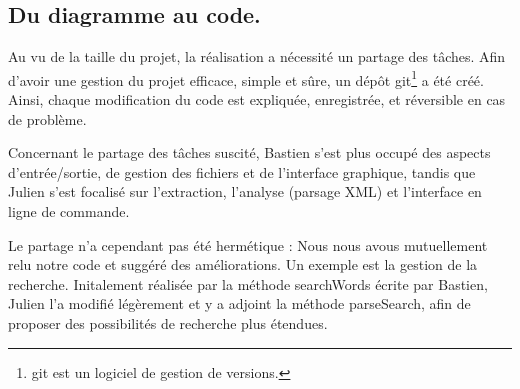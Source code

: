 \subsection{Du diagramme au code.}

Au vu de la taille du projet, la réalisation a nécessité un partage des tâches. 
Afin d'avoir une gestion du projet efficace, simple et sûre, un dépôt git\footnote{git est un logiciel de gestion de versions.} a été créé.
Ainsi, chaque modification du code est expliquée, enregistrée, et réversible en cas de problème. 

Concernant le partage des tâches suscité, Bastien s'est plus occupé des aspects d'entrée/sortie, de gestion des fichiers et de l'interface graphique, tandis que Julien
s'est focalisé sur l'extraction, l'analyse (parsage XML) et l'interface en ligne de commande. 

Le partage n'a cependant pas été hermétique : Nous nous avous mutuellement relu notre code et suggéré des améliorations. Un exemple est la gestion de la recherche. Initalement réalisée par la méthode searchWords écrite par Bastien, Julien l'a modifié légèrement et y a adjoint la méthode parseSearch, afin de proposer des possibilités de recherche plus étendues.








